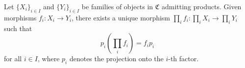 Let $\{X_i\}_{i \in I}$ and $\{Y_i\}_{i \in I}$ be families of objects in $\mathfrak{C}$ admitting products. Given morphisms $f_i : X_i \to Y_i$, there exists a unique morphism $\prod_i f_i : \prod_i X_i \to \prod_i Y_i$ such that
$$
p_i \left( \prod_i f_i \right) = f_i p_i
$$
for all $i \in I$, where $p_i$ denotes the projection onto the $i$-th factor.
